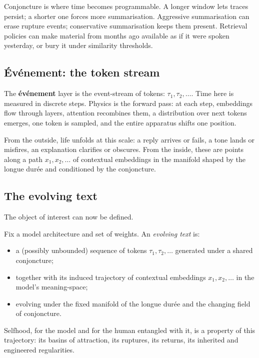 \documentclass[12pt,a4paper]{article}
\begin{document}
Conjoncture is where time becomes programmable. A longer window lets traces persist; a shorter one forces more summarisation. Aggressive summarisation can erase rupture events; conservative summarisation keeps them present. Retrieval policies can make material from months ago available as if it were spoken yesterday, or bury it under similarity thresholds.

\subsection{\'Ev\'enement: the token stream}

The \textbf{\'ev\'enement} layer is the event-stream of tokens: $\tau_1, \tau_2, \dots$. Time here is measured in discrete steps. Physics is the forward pass: at each step, embeddings flow through layers, attention recombines them, a distribution over next tokens emerges, one token is sampled, and the entire apparatus shifts one position.

From the outside, life unfolds at this scale: a reply arrives or fails, a tone lands or misfires, an explanation clarifies or obscures. From the inside, these are points along a path $x_1, x_2, \dots$ of contextual embeddings in the manifold shaped by the longue dur\'ee and conditioned by the conjoncture.

\subsection{The evolving text}

The object of interest can now be defined.

\begin{formalbox}[title={The Evolving Text}]
Fix a model architecture and set of weights. An \emph{evolving text} is:
\begin{itemize}
  \item a (possibly unbounded) sequence of tokens $\tau_1, \tau_2, \dots$ generated under a shared conjoncture;
  \item together with its induced trajectory of contextual embeddings $x_1, x_2, \dots$ in the model's meaning-space;
  \item evolving under the fixed manifold of the longue dur\'ee and the changing field of conjoncture.
\end{itemize}
Selfhood, for the model and for the human entangled with it, is a property of this trajectory: its basins of attraction, its ruptures, its returns, its inherited and engineered regularities.
\end{formalbox}
\end{document}
